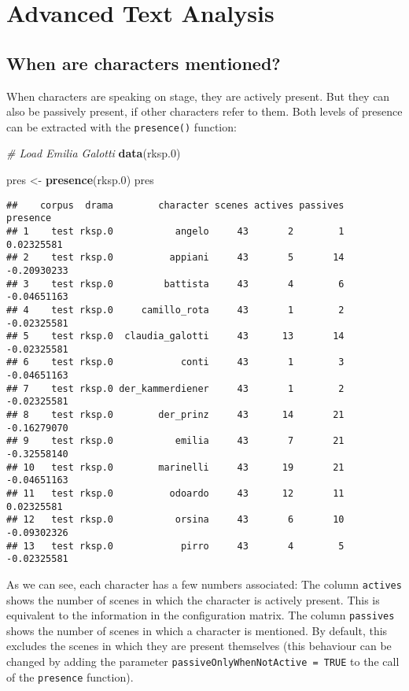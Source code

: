 \documentclass[]{book}
\newenvironment{Shaded}{\begin{snugshade}}{\end{snugshade}}
\newcommand{\CommentTok}[1]{\textcolor[rgb]{0.56,0.35,0.01}{\textit{#1}}}
\newcommand{\FloatTok}[1]{\textcolor[rgb]{0.00,0.00,0.81}{#1}}
\newcommand{\KeywordTok}[1]{\textcolor[rgb]{0.13,0.29,0.53}{\textbf{#1}}}
\newcommand{\NormalTok}[1]{#1}
\newcommand{\StringTok}[1]{\textcolor[rgb]{0.31,0.60,0.02}{#1}}
\begin{document}
\hypertarget{advanced-text-analysis}{%
\chapter{Advanced Text Analysis}\label{advanced-text-analysis}}

\hypertarget{when-are-characters-mentioned}{%
\section{When are characters mentioned?}\label{when-are-characters-mentioned}}

When characters are speaking on stage, they are actively present. But they can also be passively present, if other characters refer to them. Both levels of presence can be extracted with the \texttt{presence()} function:

\begin{Shaded}
\begin{Highlighting}[]
\CommentTok{# Load Emilia Galotti}
\KeywordTok{data}\NormalTok{(rksp}\FloatTok{.0}\NormalTok{)}

\NormalTok{pres <-}\StringTok{ }\KeywordTok{presence}\NormalTok{(rksp}\FloatTok{.0}\NormalTok{)}
\NormalTok{pres}
\end{Highlighting}
\end{Shaded}

\begin{verbatim}
##    corpus  drama        character scenes actives passives    presence
## 1    test rksp.0           angelo     43       2        1  0.02325581
## 2    test rksp.0          appiani     43       5       14 -0.20930233
## 3    test rksp.0         battista     43       4        6 -0.04651163
## 4    test rksp.0     camillo_rota     43       1        2 -0.02325581
## 5    test rksp.0  claudia_galotti     43      13       14 -0.02325581
## 6    test rksp.0            conti     43       1        3 -0.04651163
## 7    test rksp.0 der_kammerdiener     43       1        2 -0.02325581
## 8    test rksp.0        der_prinz     43      14       21 -0.16279070
## 9    test rksp.0           emilia     43       7       21 -0.32558140
## 10   test rksp.0        marinelli     43      19       21 -0.04651163
## 11   test rksp.0          odoardo     43      12       11  0.02325581
## 12   test rksp.0           orsina     43       6       10 -0.09302326
## 13   test rksp.0            pirro     43       4        5 -0.02325581
\end{verbatim}

As we can see, each character has a few numbers associated: The column \texttt{actives} shows the number of scenes in which the character is actively present. This is equivalent to the information in the configuration matrix. The column \texttt{passives} shows the number of scenes in which a character is mentioned. By default, this excludes the scenes in which they are present themselves (this behaviour can be changed by adding the parameter \texttt{passiveOnlyWhenNotActive\ =\ TRUE} to the call of the \texttt{presence} function).
\end{document}
